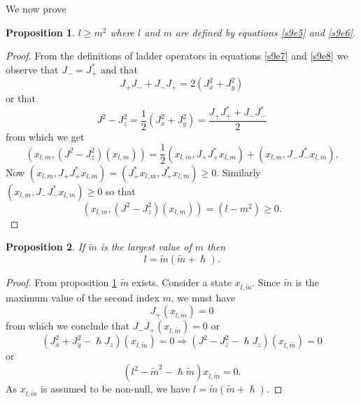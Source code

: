 \documentclass{article}
\numberwithin{equation}{section}
\theoremstyle{plain}
\numberwithin{thm}{section}
\theoremstyle{plain}
\newtheorem{prop}{Proposition}
\numberwithin{prop}{section}
\theoremstyle{definition}
\numberwithin{defn}{section}
\theoremstyle{remark}
\begin{document}
We now prove 
\begin{prop}\label{s9p1}
$l \ge m^2$ where $l$ and $m$ are defined by equations \eqref{s9e5} and
\eqref{s9e6}.
\end{prop}
\begin{proof}
From the definitions of ladder operators in equations \eqref{s9e7} and
\eqref{s9e8} we observe that $J_- = J_+^\ast$ and that
\begin{equation}\label{s9e14}
J_+J_- + J_-J_+ = 2(J_x^2 + J_y^2)
\end{equation}
or that
\begin{equation}\label{s9e15}
J^2 - J_z^2 = \frac{1}{2}(J_x^2 + J_y^2) = \frac{J_+J_+^\ast + J_-J_-^\ast}{2}
\end{equation}
from which we get
\begin{equation}\label{s9e16}
(x_{l,m}, (J^2 - J_z^2)(x_{l,m})) = 
\frac{1}{2}(x_{l,m}, J_+J_+^\ast x_{l,m}) + (x_{l,m}, J_-J_-^\ast x_{l,m}).
\end{equation}
Now $(x_{l,m}, J_+J_+^\ast x_{l,m}) = (J_+^\ast x_{l,m},J_+^\ast x_{l,m})\ge 0$.
Similarly $ (x_{l,m}, J_-J_-^\ast x_{l,m}) \ge 0$ so that
\begin{equation}\label{s9e17}
(x_{l,m}, (J^2 - J_z^2)(x_{l,m})) = (l - m^2) \ge 0.
\end{equation}
\end{proof}

\begin{prop}\label{s9p2}
If $\tilde{m}$ is the largest value of $m$ then 
\begin{equation}\label{s9e18}
l = \tilde{m}(\tilde{m} + \hslash).
\end{equation}
\end{prop}
\begin{proof}
From proposition \ref{s9p1} $\tilde{m}$ exists. Consider a state 
$x_{l,\tilde{m}}$. Since $\tilde{m}$ is the maximum value of the second
index $m$, we must have
\begin{equation}\label{s9e19}
J_+( x_{l,\tilde{m}}) = 0
\end{equation}
from which we conclude that $J_-J_+(x_{l,\tilde{m}}) = 0$ or
\begin{equation}
(J_x^2 + J_y^2 - \hslash J_z)(x_{l, \tilde{m}}) = 0 \Rightarrow
(J^2 - J_z^2 - \hslash J_z)(x_{l, \tilde{m}}) = 0
\end{equation}
or
\begin{equation}\label{s9e21}
(l^2 - \tilde{m}^2 - \hslash\tilde{m})x_{l, \tilde{m}} = 0.
\end{equation}
As $x_{l, \tilde{m}}$ is assumed to be non-null, we have 
$l = \tilde{m}(\tilde{m} + \hslash)$.
\end{proof}
\end{document}
